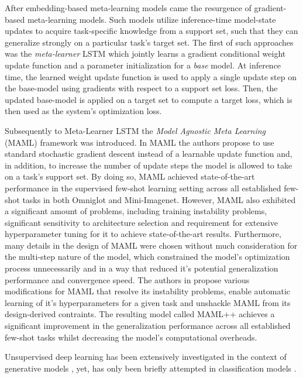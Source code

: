 \documentclass{article}
\begin{document}
After embedding-based meta-learning models came the resurgence of gradient-based meta-learning models. Such models utilize inference-time model-state updates to acquire task-specific knowledge from a support set, such that they can generalize strongly on a particular task's target set. The first of such approaches was the \emph{meta-learner} LSTM \cite{ravi2016optimization} which jointly learns a gradient conditional weight update function and a parameter initialization for a \emph{base} model. At inference time, the learned weight update function is used to apply a single update step on the base-model using gradients with respect to a support set loss. Then, the updated base-model is applied on a target set to compute a target loss, which is then used as the system's optimization loss. 

Subsequently to Meta-Learner LSTM the \emph{Model Agnostic Meta Learning} \cite{finn2017model} (MAML) framework was introduced. In MAML the authors propose to use standard stochastic gradient descent instead of a learnable update function and, in addition, to increase the number of update steps the model is allowed to take on a task's support set. By doing so, MAML achieved state-of-the-art performance in the supervised few-shot learning setting across all established few-shot tasks in both Omniglot and Mini-Imagenet. However, MAML also exhibited a significant amount of problems, including training instability problems, significant sensitivity to architecture selection and requirement for extensive hyperparameter tuning for it to achieve state-of-the-art results. Furthermore, many details in the design of MAML were chosen without much consideration for the multi-step nature of the model, which constrained the model's optimization process unnecessarily and in a way that reduced it's potential generalization performance and convergence speed. The authors in \citet{antoniou2018train} propose various modifications for MAML that resolve its instability problems, enable automatic learning of it's hyperparameters for a given task and unshackle MAML from its design-derived contraints. The resulting model called MAML++ achieves a significant improvement in the generalization performance across all established few-shot tasks whilst decreasing the model's computational overheads. 

Unsupervised deep learning has been extensively investigated in the context of generative models \cite{doersch2016tutorial, vincent2008extracting,goodfellow2014generative}, yet, has only been briefly attempted in classification models    \cite{caron2018deep,bojanowski2017unsupervised}. 
\end{document}
